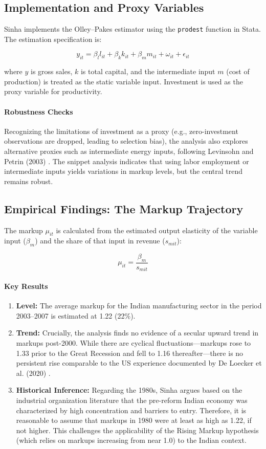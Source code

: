 \documentclass[12pt]{article}
\begin{document}
\subsection{Implementation and Proxy Variables}
Sinha implements the Olley–Pakes estimator using the \texttt{prodest} function in Stata. The estimation specification is:

\[
y_{it} = \beta_l l_{it} + \beta_k k_{it} + \beta_m m_{it} + \omega_{it} + \epsilon_{it}
\]

where $y$ is gross sales, $k$ is total capital, and the intermediate input $m$ (cost of production) is treated as the static variable input. Investment is used as the proxy variable for productivity.

\paragraph{Robustness Checks}
Recognizing the limitations of investment as a proxy (e.g., zero-investment observations are dropped, leading to selection bias), the analysis also explores alternative proxies such as intermediate energy inputs, following Levinsohn and Petrin (2003) \citep{LevinsohnPetrin2003}. The snippet analysis indicates that using labor employment or intermediate inputs yields variations in markup levels, but the central trend remains robust.

\subsection{Empirical Findings: The Markup Trajectory}
The markup $\mu_{it}$ is calculated from the estimated output elasticity of the variable input ($\beta_m$) and the share of that input in revenue ($s_{mit}$):

\[
\mu_{it} = \frac{\beta_m}{s_{mit}}
\]

\paragraph{Key Results}
\begin{enumerate}[leftmargin=*,itemsep=4pt]
\item \textbf{Level:} The average markup for the Indian manufacturing sector in the period 2003–2007 is estimated at 1.22 (22\%).
\item \textbf{Trend:} Crucially, the analysis finds no evidence of a secular upward trend in markups post-2000. While there are cyclical fluctuations—markups rose to 1.33 prior to the Great Recession and fell to 1.16 thereafter—there is no persistent rise comparable to the US experience documented by De Loecker et al. (2020) \citep{DeLoecker2020}.
\item \textbf{Historical Inference:} Regarding the 1980s, Sinha argues based on the industrial organization literature that the pre-reform Indian economy was characterized by high concentration and barriers to entry. Therefore, it is reasonable to assume that markups in 1980 were at least as high as 1.22, if not higher. This challenges the applicability of the Rising Markup hypothesis (which relies on markups increasing from near 1.0) to the Indian context.
\end{enumerate}
\end{document}
